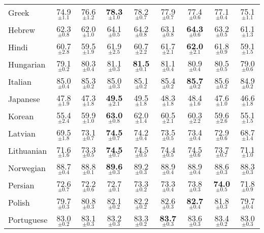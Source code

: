 \begin{table*}[ht]
{{\begin{tabular}{lcccccccc}
Greek & 74.9$_{\pm 1.1}$ & 76.6$_{\pm 1.2}$ & \textbf{78.3}$_{\pm 1.0}$ & 78.2$_{\pm 0.7}$ & 77.9$_{\pm 0.7}$ & 77.4$_{\pm 0.6}$ & 77.1$_{\pm 0.4}$ & 75.1$_{\pm 1.1}$ \\
Hebrew & 62.3$_{\pm 0.8}$ & 62.0$_{\pm 1.0}$ & 64.1$_{\pm 0.5}$ & 64.2$_{\pm 0.8}$ & 63.1$_{\pm 0.8}$ & \textbf{64.3}$_{\pm 0.6}$ & 63.2$_{\pm 0.5}$ & 61.1$_{\pm 1.3}$ \\
Hindi & 60.7$_{\pm 2.8}$ & 59.5$_{\pm 1.9}$ & 61.9$_{\pm 2.5}$ & 60.7$_{\pm 2.2}$ & 61.7$_{\pm 2.1}$ & \textbf{62.0}$_{\pm 2.1}$ & 61.8$_{\pm 0.9}$ & 59.1$_{\pm 1.5}$ \\
Hungarian & 79.1$_{\pm 0.2}$ & 80.3$_{\pm 0.4}$ & 81.1$_{\pm 0.3}$ & \textbf{81.5}$_{\pm 0.1}$ & 81.1$_{\pm 0.4}$ & 80.9$_{\pm 0.4}$ & 80.5$_{\pm 0.5}$ & 79.0$_{\pm 0.6}$ \\
Italian & 85.0$_{\pm 0.4}$ & 85.3$_{\pm 0.2}$ & 85.0$_{\pm 0.3}$ & 85.1$_{\pm 0.2}$ & 85.4$_{\pm 0.2}$ & \textbf{85.7}$_{\pm 0.2}$ & 85.6$_{\pm 0.2}$ & 84.9$_{\pm 0.2}$ \\
Japanese & 47.8$_{\pm 1.9}$ & 47.3$_{\pm 1.8}$ & \textbf{49.5}$_{\pm 2.1}$ & 49.5$_{\pm 1.8}$ & 48.3$_{\pm 1.8}$ & 48.4$_{\pm 1.6}$ & 47.6$_{\pm 1.0}$ & 46.6$_{\pm 1.8}$ \\
Korean & 55.4$_{\pm 2.4}$ & 59.9$_{\pm 1.0}$ & \textbf{63.0}$_{\pm 0.8}$ & 62.0$_{\pm 1.4}$ & 60.5$_{\pm 2.1}$ & 60.3$_{\pm 2.2}$ & 59.6$_{\pm 2.6}$ & 55.1$_{\pm 1.5}$ \\
Latvian & 69.5$_{\pm 1.8}$ & 73.1$_{\pm 0.7}$ & \textbf{74.5}$_{\pm 0.7}$ & 74.2$_{\pm 0.4}$ & 73.5$_{\pm 0.5}$ & 73.4$_{\pm 0.4}$ & 72.9$_{\pm 0.6}$ & 68.7$_{\pm 1.4}$ \\
Lithuanian & 71.6$_{\pm 1.6}$ & 73.3$_{\pm 0.5}$ & \textbf{74.5}$_{\pm 0.7}$ & 74.5$_{\pm 0.5}$ & 74.4$_{\pm 0.5}$ & 74.5$_{\pm 0.6}$ & 73.7$_{\pm 0.7}$ & 71.1$_{\pm 1.0}$ \\
Norwegian & 88.7$_{\pm 0.4}$ & 88.8$_{\pm 0.1}$ & \textbf{89.6}$_{\pm 0.3}$ & 89.2$_{\pm 0.3}$ & 88.9$_{\pm 0.4}$ & 88.9$_{\pm 0.4}$ & 88.6$_{\pm 0.3}$ & 88.3$_{\pm 0.3}$ \\
Persian & 72.6$_{\pm 0.7}$ & 72.2$_{\pm 0.6}$ & 72.7$_{\pm 0.1}$ & 73.3$_{\pm 0.2}$ & 73.3$_{\pm 0.4}$ & 73.8$_{\pm 0.3}$ & \textbf{74.0}$_{\pm 0.5}$ & 71.8$_{\pm 0.9}$ \\
Polish & 79.7$_{\pm 0.3}$ & 80.8$_{\pm 0.3}$ & 82.1$_{\pm 0.2}$ & 82.2$_{\pm 0.2}$ & 82.6$_{\pm 0.3}$ & \textbf{82.7}$_{\pm 0.4}$ & 81.8$_{\pm 0.3}$ & 79.7$_{\pm 0.4}$ \\
Portuguese & 83.0$_{\pm 0.2}$ & 83.1$_{\pm 0.3}$ & 83.2$_{\pm 0.3}$ & 83.3$_{\pm 0.2}$ & \textbf{83.7}$_{\pm 0.3}$ & 83.6$_{\pm 0.3}$ & 83.4$_{\pm 0.2}$ & 83.0$_{\pm 0.3}$ \\

\end{tabular}}}
\end{table*}
